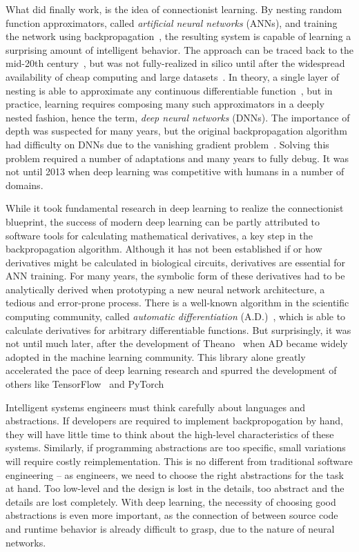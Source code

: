 \documentclass[12pt,initial,twoside,maitrise]{dms}
\numberwithin{equation}{section}
\numberwithin{table}{chapter}
\numberwithin{figure}{chapter}
\begin{document}
What did finally work, is the idea of connectionist learning. By nesting random function approximators, called \textit{artificial neural networks} (ANNs), and training the network using backpropagation~\citep{werbos1990backpropagation, rumelhart1988learning}, the resulting system is capable of learning a surprising amount of intelligent behavior. The approach can be traced back to the mid-20th century~\citep{ivakhnenko1965cybernetic, rosenblatt1958perceptron}, but was not fully-realized in silico until after the widespread availability of cheap computing and large datasets~\citep{lecun2015deep}. In theory, a single layer of nesting is able to approximate any continuous differentiable function~\citep{hornik1989multilayer}, but in practice, learning requires composing many such approximators in a deeply nested fashion, hence the term, \textit{deep neural networks} (DNNs). The importance of depth was suspected for many years, but the original backpropagation algorithm had difficulty on DNNs due to the vanishing gradient problem~\citep{bengio1994learning}. Solving this problem required a number of adaptations and many years to fully debug. It was not until 2013 when deep learning was competitive with humans in a number of domains.

While it took fundamental research in deep learning to realize the connectionist blueprint, the success of modern deep learning can be partly attributed to software tools for calculating mathematical derivatives, a key step in the backpropagation algorithm. Although it has not been established if or how derivatives might be calculated in biological circuits, derivatives are essential for ANN training. For many years, the symbolic form of these derivatives had to be analytically derived when prototyping a new neural network architecture, a tedious and error-prone process. There is a well-known algorithm in the scientific computing community, called \textit{automatic differentiation} (A.D.)~\citep{linnainmaa1970representation, griewank1989automatic}, which is able to calculate derivatives for arbitrary differentiable functions. But surprisingly, it was not until much later, after the development of Theano~\citep{theano} when AD became widely adopted in the machine learning community. This library alone greatly accelerated the pace of deep learning research and spurred the development of others like TensorFlow~\citep{abadi2016tensorflow} and PyTorch~\citep{paszke2017automatic}

Intelligent systems engineers must think carefully about languages and abstractions. If developers are required to implement backpropogation by hand, they will have little time to think about the high-level characteristics of these systems. Similarly, if programming abstractions are too specific, small variations will require costly reimplementation. This is no different from traditional software engineering -- as engineers, we need to choose the right abstractions for the task at hand. Too low-level and the design is lost in the details, too abstract and the details are lost completely. With deep learning, the necessity of choosing good abstractions is even more important, as the connection of between source code and runtime behavior is already difficult to grasp, due to the nature of neural networks.
\end{document}
